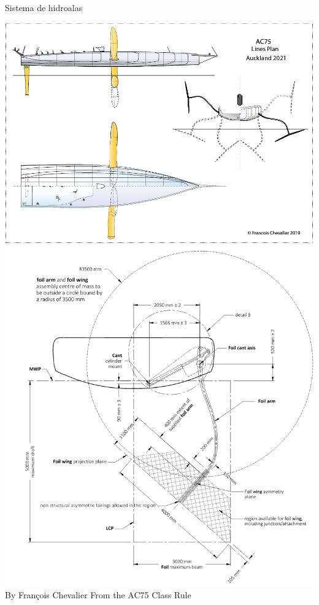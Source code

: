 \documentclass[presentation,aspectratio=169]{beamer}
\begin{document}
\begin{frame}[label={sec:org8733a51}]{Sistema de hidroalas}
 \begin{center}
\includegraphics[height=0.6\textheight]{../../figures/AC75-lines.png}
\includegraphics[height=0.7\textheight]{../../figures/AC75-class-foil.png}\\
{\footnotesize  By François Chevalier \hfill From the AC75 Class Rule}
\end{center}
\end{frame}
\end{document}
